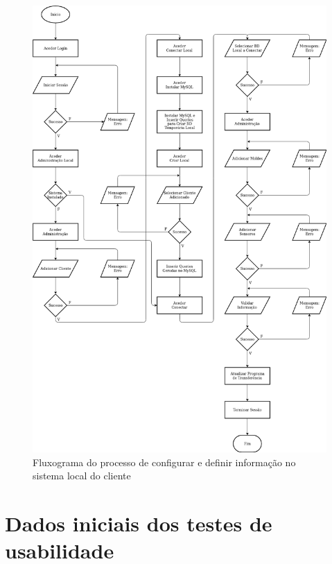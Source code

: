 \documentclass[11pt,twoside,a4paper]{report}
\begin{document}
\begin{figure}[H]
	\vspace{-2.5cm}
	\begin{center}
		\includegraphics[width=1\textwidth]{fluxograma_administracao03} %
		\caption[Fluxograma do processo de configurar e definir informação no sistema local do cliente]{Fluxograma do processo de configurar e definir informação no sistema local do cliente}
		\label{fig:aplicacao_admin}
	\end{center}
\end{figure}

\cleardoublepage
\chapter{Dados iniciais dos testes de usabilidade}
\label{apen:usabilidade}
\end{document}
